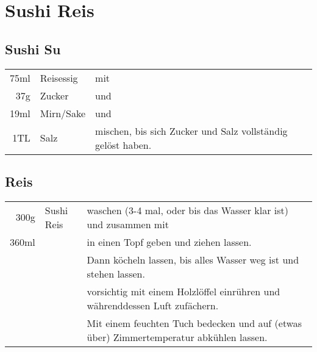 \section{Sushi Reis}\label{sec:sushi_rice}
\subsection*{Sushi Su}\label{subsec:sushi_su}
\begin{longtable}{rlL{17.8cm}}
	75ml	&	Reisessig	&	mit\\
	37g		&	Zucker 		&	und\\
	19ml	&	Mirn/Sake	&	und\\
	1TL		&	Salz		&	mischen, bis sich Zucker und Salz vollständig gelöst haben.\\
\end{longtable}

\subsection*{Reis}
\begin{longtable}{rlL{17cm}}
	300g	&	Sushi Reis			&	waschen (3-4 mal, oder bis das Wasser klar ist) und zusammen mit\\
	360ml	&		&	in einen Topf geben und  ziehen lassen.\\
			&			 			&	Dann köcheln lassen, bis alles Wasser weg ist und  stehen lassen.\\
			&		&	vorsichtig mit einem Holzlöffel einrühren und währenddessen Luft zufächern.\\
			&						&	Mit einem feuchten Tuch bedecken und auf (etwas über) Zimmertemperatur abkühlen lassen.\\
\end{longtable}
